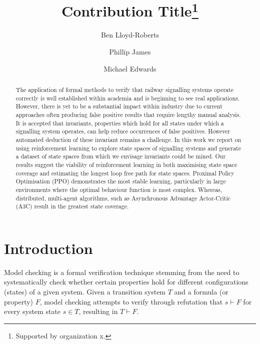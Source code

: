 \documentclass[runningheads]{llncs}
\begin{document}
%
\title{Contribution Title\thanks{Supported by organization x.}}
%
%
\author{Ben Lloyd-Roberts \and
{Phillip James} \and
Michael Edwards}
%
%
%
\maketitle              %
%
\begin{abstract}
The application of formal methods to verify that railway signalling systems operate correctly is well established within academia and is beginning to see real applications. However, there is yet to be a substantial impact within industry due to current approaches often producing false positive results that require lengthy manual analysis. It is accepted that invariants, properties which hold for all states under which a signalling system operates, can help reduce occurrences of false positives. However automated deduction of these invariant remains a challenge. In this work we report on using reinforcement learning to explore state spaces of signalling systems and generate a dataset of state spaces from which we envisage invariants could be mined. Our results suggest the viability of reinforcement learning in both maximising state space coverage and estimating the longest loop free path for state spaces. Proximal Policy Optimisation (PPO) demonstrates the most stable learning, particularly in large environments where the optimal behaviour function is most complex. Whereas, distributed, multi-agent algorithms, such as Asynchronous Advantage Actor-Critic (A3C) result in the greatest state coverage.

\end{abstract}
%
%
%
\section{Introduction}
Model checking is a formal verification technique stemming from the need to systematically
check whether certain properties hold for different configurations (states) of a given system.
Given a transition system $T$ and a formula (or property) $F$, model checking attempts to verify through refutation that $s \vdash F$ for every system state $s \in T$, resulting in $T \vdash F$. 
\end{document}
